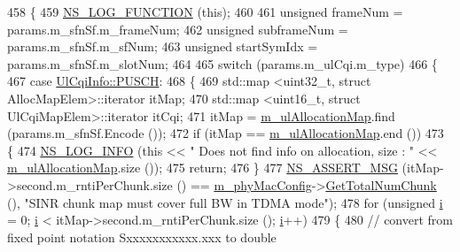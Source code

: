 \begin{DoxyCode}
458 \{
459   \hyperlink{log-macros-disabled_8h_a90b90d5bad1f39cb1b64923ea94c0761}{NS\_LOG\_FUNCTION} (\textcolor{keyword}{this});
460 
461         \textcolor{keywordtype}{unsigned} frameNum = params.m\_sfnSf.m\_frameNum;
462         \textcolor{keywordtype}{unsigned} subframeNum =  params.m\_sfnSf.m\_sfNum;
463         \textcolor{keywordtype}{unsigned} startSymIdx =  params.m\_sfnSf.m\_slotNum;
464 
465         \textcolor{keywordflow}{switch} (params.m\_ulCqi.m\_type)
466         \{
467                 \textcolor{keywordflow}{case} \hyperlink{structns3_1_1UlCqiInfo_a8241de30e4fdc8640e892ddf1e2a6c00a6d4b515df7c45a6843584459fbde26a7}{UlCqiInfo::PUSCH}:
468                 \{
469                         std::map <uint32\_t, struct AllocMapElem>::iterator itMap;
470                         std::map <uint16\_t, struct UlCqiMapElem>::iterator itCqi;
471                         itMap = \hyperlink{classns3_1_1MmWaveFlexTtiMaxWeightMacScheduler_ac8ae3992d5f26804eff2d4cab3309777}{m\_ulAllocationMap}.find (params.m\_sfnSf.Encode ());
472                         \textcolor{keywordflow}{if} (itMap == \hyperlink{classns3_1_1MmWaveFlexTtiMaxWeightMacScheduler_ac8ae3992d5f26804eff2d4cab3309777}{m\_ulAllocationMap}.end ())
473                         \{
474                                 \hyperlink{group__logging_gafbd73ee2cf9f26b319f49086d8e860fb}{NS\_LOG\_INFO} (\textcolor{keyword}{this} << \textcolor{stringliteral}{" Does not find info on allocation, size : 
      "} << \hyperlink{classns3_1_1MmWaveFlexTtiMaxWeightMacScheduler_ac8ae3992d5f26804eff2d4cab3309777}{m\_ulAllocationMap}.size ());
475                                 \textcolor{keywordflow}{return};
476                         \}
477                         \hyperlink{assert_8h_aff5ece9066c74e681e74999856f08539}{NS\_ASSERT\_MSG} (itMap->second.m\_rntiPerChunk.size () == 
      \hyperlink{classns3_1_1MmWaveMacScheduler_a24d7af4971d2e500fe543cefbafa2fd9}{m\_phyMacConfig}->\hyperlink{classns3_1_1MmWavePhyMacCommon_a97e82c809a351fea9d5058ac1bb4c3c6}{GetTotalNumChunk} (), \textcolor{stringliteral}{"SINR chunk map must cover full BW in
       TDMA mode"});
478                         \textcolor{keywordflow}{for} (\textcolor{keywordtype}{unsigned} \hyperlink{bernuolliDistribution_8m_a6f6ccfcf58b31cb6412107d9d5281426}{i} = 0; \hyperlink{bernuolliDistribution_8m_a6f6ccfcf58b31cb6412107d9d5281426}{i} < itMap->second.m\_rntiPerChunk.size (); 
      \hyperlink{bernuolliDistribution_8m_a6f6ccfcf58b31cb6412107d9d5281426}{i}++)
479                         \{
480                                 \textcolor{comment}{// convert from fixed point notation Sxxxxxxxxxxx.xxx to double}

\end{DoxyCode}

